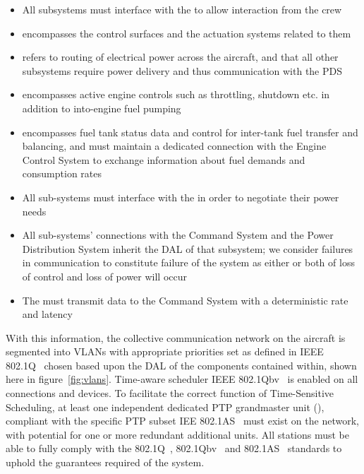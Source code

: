 \begin{itemize}
    \item All subsystems must interface with the  to allow interaction from the crew
    \item {} encompasses the control surfaces and the actuation systems related to them
    \item {} refers to routing of electrical power across the aircraft, and that all other subsystems require power delivery and thus communication with the PDS
    \item {} encompasses active engine controls such as throttling, shutdown etc. in addition to into-engine fuel pumping
    \item {} encompasses fuel tank status data and control for inter-tank fuel transfer and balancing, and must maintain a dedicated connection with the Engine Control System to exchange information about fuel demands and consumption rates
    \item All sub-systems must interface with the  in order to negotiate their power needs
    \item All sub-systems' connections with the Command System and the Power Distribution System inherit the DAL of that subsystem; we consider failures in communication to constitute failure of the system as either or both of loss of control and loss of power will occur
    \item The  must transmit data to the Command System with a deterministic rate and latency
\end{itemize}

With this information, the collective communication network on the aircraft is segmented into VLANs with appropriate priorities set as defined in IEEE 802.1Q~\cite{IEEEStandardLocal2022} chosen based upon the DAL of the components contained within, shown here in figure~\ref{fig:vlans}.
Time-aware scheduler IEEE 802.1Qbv~\cite{IEEEStandardLocal2018a,ISOIECIEEE2018} is enabled on all connections and devices.
To facilitate the correct function of Time-Sensitive Scheduling, at least one independent dedicated PTP grandmaster unit (), compliant with the specific PTP subset IEE 802.1AS~\cite{IEEEStandardLocal2020} must exist on the network, with potential for one or more redundant additional units.
All stations must be able to fully comply with the 802.1Q~\cite{IEEEStandardLocal2018a}, 802.1Qbv~\cite{IEEEStandardLocal2016a} and 802.1AS~\cite{IEEEStandardLocal2020} standards to uphold the guarantees required of the system.

